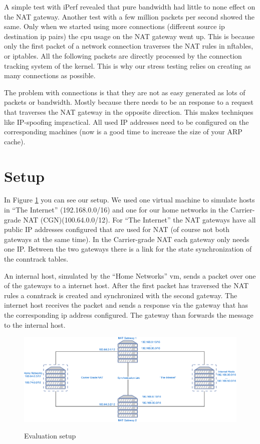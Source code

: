 \documentclass{report}
\begin{document}
A simple test with iPerf\cite{iperf} revealed that pure bandwidth had little
to none effect on the NAT gateway. Another test with a few million
packets per second showed the same. Only when we started using more
connections (different source ip destination ip pairs) the cpu usage on
the NAT gateway went up. This is because only the first packet of a
network connection traverses the NAT rules in nftables, or iptables. All
the following packets are directly processed by the connection tracking
system of the kernel. This is why our stress testing relies on creating
as many connections as possible.

The problem with connections is that they are not as easy generated as
lots of packets or bandwidth. Mostly because there needs to be an
response to a request that traverses the NAT gateway in the opposite
direction. This makes techniques like IP-spoofing impractical. All used
IP addresses need to be configured on the corresponding machines (now is
a good time to increase the size of your ARP cache).

\section{Setup}\label{setup-1}

In Figure \ref{EvaluationSetup.pdf} you can see our setup. We used one virtual machine to simulate
hosts in ``The Internet'' (192.168.0.0/16) and one for our home networks
in the Carrier-grade NAT (CGN)(100.64.0.0/12). For ``The Internet'' the
NAT gateways have all public IP addresses configured that are used for
NAT (of course not both gateways at the same time). In the Carrier-grade
NAT each gateway only needs one IP. Between the two gateways there is a
link for the state synchronization of the conntrack tables.

An internal host, simulated by the ``Home Networks'' vm, sends a packet
over one of the gateways to a internet host. After the first packet has
traversed the NAT rules a conntrack is created and synchronized with the
second gateway. The internet host receives the packet and sends a
response via the gateway that has the corresponding ip address
configured. The gateway than forwards the message to the internal host.

\begin{figure}[ht]
	\centering
	\includegraphics[width=\textwidth]{../EvaluationSetup.pdf}
	\label{EvaluationSetup.pdf}
	\caption{Evaluation setup}  
\end{figure}
\end{document}
